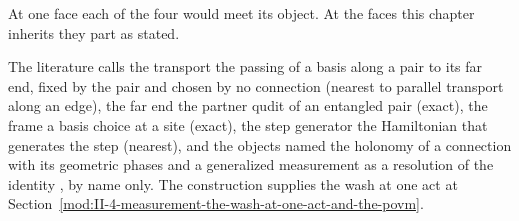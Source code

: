 At one face each of the four would meet its object. At the faces this chapter inherits they part as stated.
\begin{chbridge}
The literature calls the transport the passing of a basis along a pair to its far end, fixed by the pair and chosen by no connection (nearest to parallel transport along an edge), the far end the partner qudit of an entangled pair (exact), the frame a basis choice at a site (exact), the step generator the Hamiltonian that generates the step (nearest), and the objects named the holonomy of a connection with its geometric phases \cite{Berry1984,Simon1983} and a generalized measurement as a resolution of the identity \cite{Nielsen2000}, by name only. The construction supplies the wash at one act at Section~\ref{mod:II-4-measurement-the-wash-at-one-act-and-the-povm}.
\end{chbridge}

